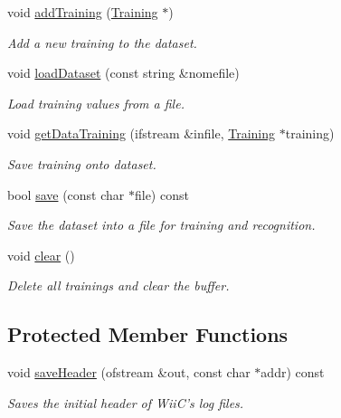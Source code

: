 \begin{DoxyCompactItemize}
\item 
void \hyperlink{class_dataset_a93ab78c0e05f3048c2d9cb0c9afcd3a5}{add\-Training} (\hyperlink{class_training}{Training} $\ast$)
\begin{DoxyCompactList}\small\item\em Add a new training to the dataset. \end{DoxyCompactList}\item 
void \hyperlink{class_dataset_aed0d5ae0808489628f0a8df2500631cc}{load\-Dataset} (const string \&nomefile)
\begin{DoxyCompactList}\small\item\em Load training values from a file. \end{DoxyCompactList}\item 
void \hyperlink{class_dataset_a7bdfc78ad93ba76b10009216269ee814}{get\-Data\-Training} (ifstream \&infile, \hyperlink{class_training}{Training} $\ast$training)
\begin{DoxyCompactList}\small\item\em Save training onto dataset. \end{DoxyCompactList}\item 
bool \hyperlink{class_dataset_abf4a6c4669f7079d334abd7be6137870}{save} (const char $\ast$file) const 
\begin{DoxyCompactList}\small\item\em Save the dataset into a file for training and recognition. \end{DoxyCompactList}\item 
\hypertarget{class_dataset_a67744c3bdc87acd2a8189b9c4fbcd192}{void \hyperlink{class_dataset_a67744c3bdc87acd2a8189b9c4fbcd192}{clear} ()}\label{class_dataset_a67744c3bdc87acd2a8189b9c4fbcd192}

\begin{DoxyCompactList}\small\item\em Delete all trainings and clear the buffer. \end{DoxyCompactList}\end{DoxyCompactItemize}
\subsection*{Protected Member Functions}
\begin{DoxyCompactItemize}
\item 
void \hyperlink{class_dataset_a23110f7d2b6bc77a388e8dafee9772b3}{save\-Header} (ofstream \&out, const char $\ast$addr) const 
\begin{DoxyCompactList}\small\item\em Saves the initial header of Wii\-C's log files. \end{DoxyCompactList}\end{DoxyCompactItemize}
